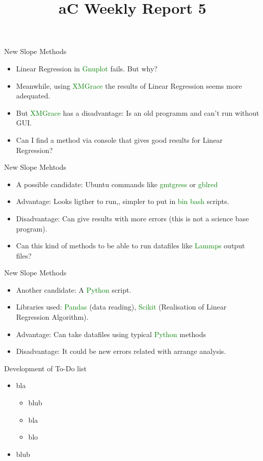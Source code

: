 \documentclass[11pt]{beamer}
\newcommand{\done}{\rlap{$\square$}{\raisebox{2pt}{\large\hspace{1pt}\ding{51}}}%
    \hspace{-2.5pt}}
\newcommand{\fail}{\rlap{$\square$}{\large\hspace{1pt}\ding{55}}}
\newcommand{\pend}{\rlap{$\square$}{\raisebox{2pt}{\large\hspace{1pt}}}%
    \hspace{6.5 pt}}
\begin{document}
\begin{frame}{New Slope Methods}
\begin{itemize}
    \item Linear Regression in \textcolor{green}{Gnuplot} fails. But why?
    \item Meanwhile, using \textcolor{green}{XMGrace} the results of Linear Regression seems more adequated.
    \item But \textcolor{green}{XMGrace} has a disadvantage: Is an old programm and can't run without GUI.
    \item Can I find a method via console that gives good results for Linear Regression?
\end{itemize}
\end{frame}
\begin{frame}{New Slope Mehtods}
\begin{itemize}
    \item A possible candidate: Ubuntu commands like \textcolor{green}{gmtgress} or \textcolor{green}{gblred}
    \item Advantage: Looks ligther to run,, simpler to put in \textcolor{green}{bin bash} scripts.
    \item Disadvantage: Can give results with more errors (this is not a science base program). 
    \item Can this kind of methods to be able to run datafiles like \textcolor{green}{Lammps} output files?
\end{itemize}
\end{frame}
\begin{frame}{New Slope Methods}
\begin{itemize}
    \item Another candidate: A \textcolor{green}{Python} script.
    \item Libraries used: \textcolor{green}{Pandas} (data reading), \textcolor{green}{Scikit} (Realisation of Linear Regression Algorithm).
    \item Advantage: Can take datafiles using typical \textcolor{green}{Python} methods
    \item Disadvantage: It could be new errors related with arrange analysis.
\end{itemize}
\end{frame}

\title[NV-aC5]{aC Weekly Report 5} 
\begin{frame}
\titlepage 
\end{frame}
\begin{frame}{Development of To-Do list}
\begin{itemize}
\item bla
\begin{itemize}
\item[\done] blub
\item[\fail] bla
\item[\pend] blo
\end{itemize}
\item blub
\end{itemize}
\end{frame} 
\end{document}
